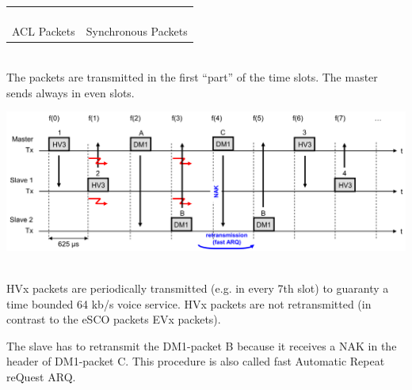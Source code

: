 	\begin{tabular}{ll}
		\parbox{9cm}{
			 \\ ACL Packets 
		}	
		& \parbox{9cm}{
			 \\ Synchronous Packets 
		}
	\end{tabular}	\\

	The packets are transmitted in the first “part” of the time slots. The master sends always 
	in even slots. \\
	
	\begin{minipage}{16cm}
		\includegraphics[width=16cm]{./bilder/bt-packet-transmission.png} 
	\end{minipage} \\
 

	HVx packets are periodically transmitted (e.g. in every 7th slot) to guaranty a time bounded 64 kb/s voice 
	service. HVx packets are not retransmitted (in contrast to the eSCO packets EVx 
	packets). 

	The slave has to retransmit the DM1-packet B because it receives a NAK in the header 
	of DM1-packet C. This procedure is also called fast Automatic Repeat reQuest ARQ. 

	
	